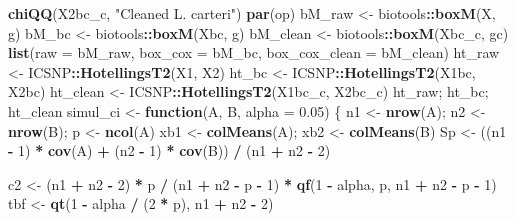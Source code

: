 \documentclass[
  11pt,
]{article}
\newenvironment{Shaded}{\begin{snugshade}}{\end{snugshade}}
\newcommand{\AttributeTok}[1]{\textcolor[rgb]{0.13,0.29,0.53}{#1}}
\newcommand{\ControlFlowTok}[1]{\textcolor[rgb]{0.13,0.29,0.53}{\textbf{#1}}}
\newcommand{\DecValTok}[1]{\textcolor[rgb]{0.00,0.00,0.81}{#1}}
\newcommand{\FloatTok}[1]{\textcolor[rgb]{0.00,0.00,0.81}{#1}}
\newcommand{\FunctionTok}[1]{\textcolor[rgb]{0.13,0.29,0.53}{\textbf{#1}}}
\newcommand{\NormalTok}[1]{#1}
\newcommand{\OtherTok}[1]{\textcolor[rgb]{0.56,0.35,0.01}{#1}}
\newcommand{\SpecialCharTok}[1]{\textcolor[rgb]{0.81,0.36,0.00}{\textbf{#1}}}
\newcommand{\StringTok}[1]{\textcolor[rgb]{0.31,0.60,0.02}{#1}}
\begin{document}
\begin{Shaded}
\begin{Highlighting}[]
\FunctionTok{chiQQ}\NormalTok{(X2bc\_c, }\StringTok{"Cleaned  L. carteri"}\NormalTok{)}
\FunctionTok{par}\NormalTok{(op)}
\NormalTok{bM\_raw    }\OtherTok{\textless{}{-}}\NormalTok{ biotools}\SpecialCharTok{::}\FunctionTok{boxM}\NormalTok{(X,     g)}
\NormalTok{bM\_bc     }\OtherTok{\textless{}{-}}\NormalTok{ biotools}\SpecialCharTok{::}\FunctionTok{boxM}\NormalTok{(Xbc,   g)}
\NormalTok{bM\_clean  }\OtherTok{\textless{}{-}}\NormalTok{ biotools}\SpecialCharTok{::}\FunctionTok{boxM}\NormalTok{(Xbc\_c, gc)}
\FunctionTok{list}\NormalTok{(}\AttributeTok{raw =}\NormalTok{ bM\_raw, }\AttributeTok{box\_cox =}\NormalTok{ bM\_bc, }\AttributeTok{box\_cox\_clean =}\NormalTok{ bM\_clean)}
\NormalTok{ht\_raw   }\OtherTok{\textless{}{-}}\NormalTok{ ICSNP}\SpecialCharTok{::}\FunctionTok{HotellingsT2}\NormalTok{(X1,     X2)}
\NormalTok{ht\_bc    }\OtherTok{\textless{}{-}}\NormalTok{ ICSNP}\SpecialCharTok{::}\FunctionTok{HotellingsT2}\NormalTok{(X1bc,   X2bc)}
\NormalTok{ht\_clean }\OtherTok{\textless{}{-}}\NormalTok{ ICSNP}\SpecialCharTok{::}\FunctionTok{HotellingsT2}\NormalTok{(X1bc\_c, X2bc\_c)}
\NormalTok{ht\_raw; ht\_bc; ht\_clean}
\NormalTok{simul\_ci }\OtherTok{\textless{}{-}} \ControlFlowTok{function}\NormalTok{(A, B, }\AttributeTok{alpha =} \FloatTok{0.05}\NormalTok{) \{}
\NormalTok{  n1 }\OtherTok{\textless{}{-}} \FunctionTok{nrow}\NormalTok{(A); n2 }\OtherTok{\textless{}{-}} \FunctionTok{nrow}\NormalTok{(B); p }\OtherTok{\textless{}{-}} \FunctionTok{ncol}\NormalTok{(A)}
\NormalTok{  xb1 }\OtherTok{\textless{}{-}} \FunctionTok{colMeans}\NormalTok{(A); xb2 }\OtherTok{\textless{}{-}} \FunctionTok{colMeans}\NormalTok{(B)}
\NormalTok{  Sp  }\OtherTok{\textless{}{-}}\NormalTok{ ((n1 }\SpecialCharTok{{-}} \DecValTok{1}\NormalTok{) }\SpecialCharTok{*} \FunctionTok{cov}\NormalTok{(A) }\SpecialCharTok{+}\NormalTok{ (n2 }\SpecialCharTok{{-}} \DecValTok{1}\NormalTok{) }\SpecialCharTok{*} \FunctionTok{cov}\NormalTok{(B)) }\SpecialCharTok{/}\NormalTok{ (n1 }\SpecialCharTok{+}\NormalTok{ n2 }\SpecialCharTok{{-}} \DecValTok{2}\NormalTok{)}

\NormalTok{  c2  }\OtherTok{\textless{}{-}}\NormalTok{ (n1 }\SpecialCharTok{+}\NormalTok{ n2 }\SpecialCharTok{{-}} \DecValTok{2}\NormalTok{) }\SpecialCharTok{*}\NormalTok{ p }\SpecialCharTok{/}\NormalTok{ (n1 }\SpecialCharTok{+}\NormalTok{ n2 }\SpecialCharTok{{-}}\NormalTok{ p }\SpecialCharTok{{-}} \DecValTok{1}\NormalTok{) }\SpecialCharTok{*}
         \FunctionTok{qf}\NormalTok{(}\DecValTok{1} \SpecialCharTok{{-}}\NormalTok{ alpha, p, n1 }\SpecialCharTok{+}\NormalTok{ n2 }\SpecialCharTok{{-}}\NormalTok{ p }\SpecialCharTok{{-}} \DecValTok{1}\NormalTok{)}
\NormalTok{  tbf }\OtherTok{\textless{}{-}} \FunctionTok{qt}\NormalTok{(}\DecValTok{1} \SpecialCharTok{{-}}\NormalTok{ alpha }\SpecialCharTok{/}\NormalTok{ (}\DecValTok{2} \SpecialCharTok{*}\NormalTok{ p), n1 }\SpecialCharTok{+}\NormalTok{ n2 }\SpecialCharTok{{-}} \DecValTok{2}\NormalTok{)}


\end{Highlighting}
\end{Shaded}
\end{document}
